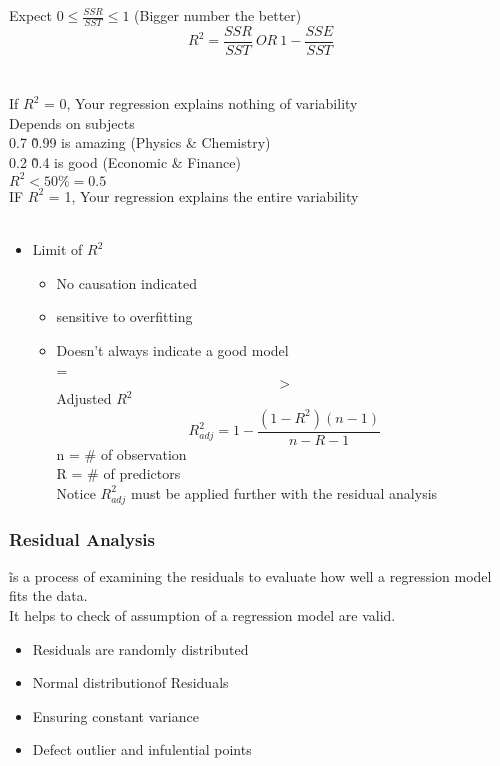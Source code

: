 \documentclass{article}
\begin{document}
Expect $0 \leq \frac{SSR}{SST} \leq 1$ (Bigger number the better) \\
\[R^2 = \frac{SSR}{SST}\ OR\ 1-\frac{SSE}{SST}\]\\
\\
If $R^2$ = 0, Your regression explains nothing of variability \\
Depends on subjects\\
0.7 \~ 0.99 is amazing (Physics \& Chemistry)\\
0.2 \~ 0.4 is good (Economic \& Finance)\\
$R^2 < 50\% = 0.5$\\
IF $R^2$ = 1, Your regression explains the entire variability\\
\\
\begin{itemize}
    \item Limit of $R^2$
    \begin{itemize}
        \item No causation indicated
        \item sensitive to overfitting
        \item Doesn't always indicate a good model\\
        =$$>$$ Adjusted $R^2$\\
        \[R^2_{adj} = 1 - \frac{(1-R^2)(n-1)}{n-R-1}\]
        n = # of observation\\
        R = # of predictors\\
        Notice $R^2_{adj}$ must be applied further with the residual analysis
    \end{itemize}
\end{itemize}

\subsubsection{Residual Analysis}
\~ is a process of examining the residuals to evaluate how well a regression model fits the data. \\
It helps to check of assumption of a regression model are valid.
\begin{itemize}
    \item Residuals are randomly distributed
    \item Normal distributionof Residuals
    \item Ensuring constant variance
    \item Defect outlier and infulential points
\end{itemize}
\end{document}
